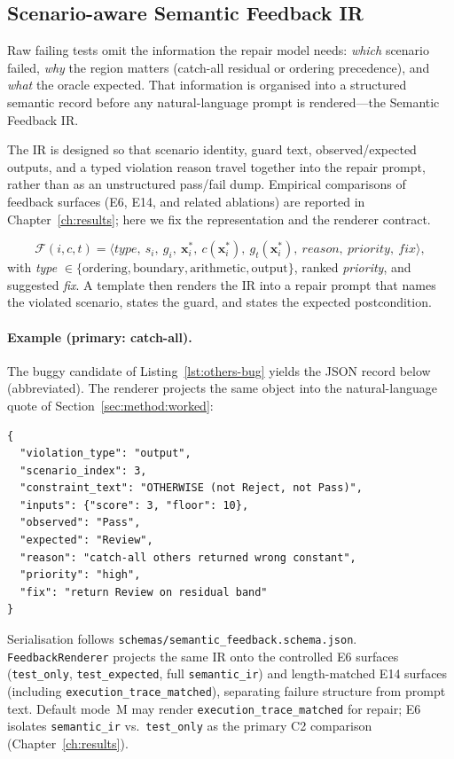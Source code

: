 \subsection{Scenario-aware Semantic Feedback IR}
\label{subsec:feedback-ir}

Raw failing tests omit the information the repair model needs:
\emph{which} scenario failed, \emph{why} the region matters (catch-all residual
or ordering precedence), and \emph{what} the oracle expected.
That information is organised into a structured semantic record before any
natural-language prompt is rendered---the Semantic Feedback IR.

The IR is designed so that scenario identity, guard text, observed/expected
outputs, and a typed violation reason travel together into the repair prompt,
rather than as an unstructured pass/fail dump.
Empirical comparisons of feedback surfaces (E6, E14, and related ablations)
are reported in Chapter~\ref{ch:results}; here we fix the representation and
the renderer contract.

\begin{equation}
  \mathcal{F}(i, c, t) = \langle \textit{type},\ s_i,\ g_i,\ \mathbf{x}_i^*,
  \ c(\mathbf{x}_i^*),\ g_t(\mathbf{x}_i^*),\ \textit{reason},\
  \textit{priority},\ \textit{fix} \rangle,
\end{equation}
with \textit{type} $\in \{\text{ordering}, \text{boundary}, \text{arithmetic},
\text{output}\}$, ranked \textit{priority}, and suggested \textit{fix}.
A template then renders the IR into a repair prompt that names the violated
scenario, states the guard, and states the expected postcondition.

\paragraph{Example (primary: catch-all).}
The buggy candidate of Listing~\ref{lst:others-bug} yields the JSON record
below (abbreviated).  The renderer projects the same object into the
natural-language quote of Section~\ref{sec:method:worked}:
\begin{lstlisting}[language={},basicstyle=\ttfamily\footnotesize,frame=single]
{
  "violation_type": "output",
  "scenario_index": 3,
  "constraint_text": "OTHERWISE (not Reject, not Pass)",
  "inputs": {"score": 3, "floor": 10},
  "observed": "Pass",
  "expected": "Review",
  "reason": "catch-all others returned wrong constant",
  "priority": "high",
  "fix": "return Review on residual band"
}
\end{lstlisting}
Serialisation follows \texttt{schemas/semantic\_feedback.schema.json}.
\texttt{FeedbackRenderer} projects the same IR onto the controlled E6 surfaces
(\texttt{test\_only}, \texttt{test\_expected}, full \texttt{semantic\_ir}) and
length-matched E14 surfaces (including \texttt{execution\_trace\_matched}),
separating failure structure from prompt text.
Default mode~M may render \texttt{execution\_trace\_matched} for repair;
E6 isolates \texttt{semantic\_ir} vs.\ \texttt{test\_only} as the primary C2
comparison (Chapter~\ref{ch:results}).

